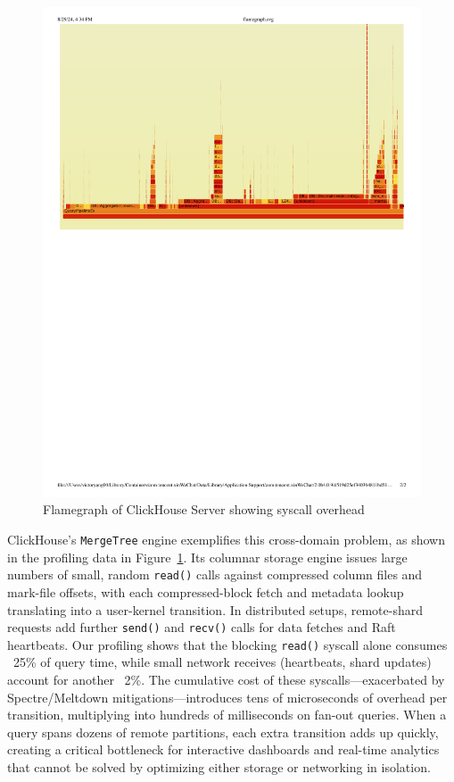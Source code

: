 \documentclass[sigconf,10pt]{acmart}
\begin{document}
\begin{figure}[h]
\centering
\includegraphics[width=\columnwidth]{img/flamegraph.pdf}
\caption{Flamegraph of ClickHouse Server showing syscall overhead}\label{fig:profiling}
\end{figure}

ClickHouse's \texttt{MergeTree} engine exemplifies this cross-domain problem, as shown in the profiling data in Figure~\ref{fig:profiling}. Its columnar storage engine issues large numbers of small, random \texttt{read()} calls against compressed column files and mark-file offsets, with each compressed-block fetch and metadata lookup translating into a user-kernel transition. In distributed setups, remote-shard requests add further \texttt{send()} and \texttt{recv()} calls for data fetches and Raft heartbeats. Our profiling shows that the blocking \texttt{read()} syscall alone consumes ~25\% of query time, while small network receives (heartbeats, shard updates) account for another ~2\%. The cumulative cost of these syscalls—exacerbated by Spectre/Meltdown mitigations—introduces tens of microseconds of overhead per transition, multiplying into hundreds of milliseconds on fan-out queries. When a query spans dozens of remote partitions, each extra transition adds up quickly, creating a critical bottleneck for interactive dashboards and real-time analytics that cannot be solved by optimizing either storage or networking in isolation.
\end{document}

